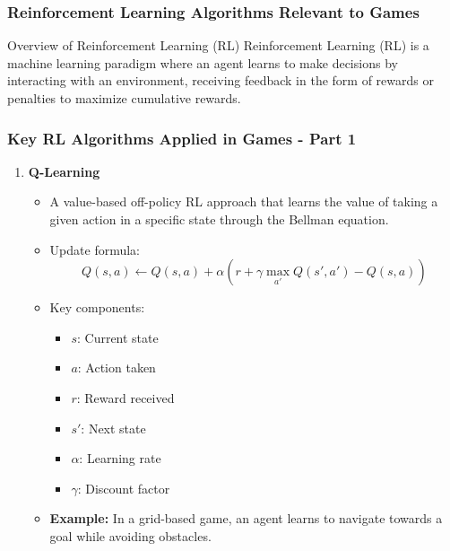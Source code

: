 \documentclass[aspectratio=169]{beamer}
\begin{document}
\begin{frame}[fragile]
    \frametitle{Reinforcement Learning Algorithms Relevant to Games} 
    \begin{block}{Overview of Reinforcement Learning (RL)}
        Reinforcement Learning (RL) is a machine learning paradigm where an agent learns to make decisions by interacting with an environment, receiving feedback in the form of rewards or penalties to maximize cumulative rewards.
    \end{block}
\end{frame}

\begin{frame}[fragile]
    \frametitle{Key RL Algorithms Applied in Games - Part 1}
    \begin{enumerate}
        \item \textbf{Q-Learning}
        \begin{itemize}
            \item A value-based off-policy RL approach that learns the value of taking a given action in a specific state through the Bellman equation.
            \item Update formula:
            \begin{equation}
                Q(s, a) \leftarrow Q(s, a) + \alpha \left( r + \gamma \max_{a'} Q(s', a') - Q(s, a) \right)
            \end{equation}
            \item Key components:
            \begin{itemize}
                \item $s$: Current state
                \item $a$: Action taken
                \item $r$: Reward received
                \item $s'$: Next state
                \item $\alpha$: Learning rate
                \item $\gamma$: Discount factor
            \end{itemize}
            \item \textbf{Example:} In a grid-based game, an agent learns to navigate towards a goal while avoiding obstacles.
        \end{itemize}
    \end{enumerate}
\end{frame}
\end{document}
